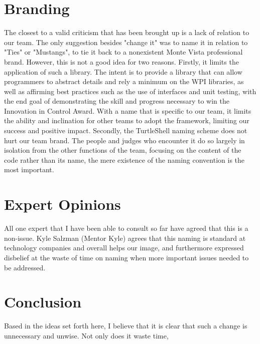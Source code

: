 \documentclass[]{article}
\begin{document}
\section{Branding}
The closest to a valid criticism that has been brought up is a lack of relation to our team. The only suggestion besides "change it" was to name it in relation to "Ties" or "Mustangs", to tie it back to a nonexistent Monte Vista professional brand. However, this is not a good idea for two reasons. Firstly, it limits the application of such a library. The intent is to provide a library that can allow programmers to abstract details and rely a minimum on the WPI libraries, as well as affirming best practices such as the use of interfaces and unit testing, with the end goal of demonstrating the skill and progress necessary to win the Innovation in Control Award. With a name that is specific to our team, it limits the ability and inclination for other teams to adopt the framework, limiting our success and positive impact. Secondly, the TurtleShell naming scheme does not hurt our team brand. The people and judges who encounter it do so largely in isolation from the other functions of the team, focusing on the content of the code rather than its name, the mere existence of the naming convention is the most important.

\section{Expert Opinions}
All one expert that I have been able to consult so far have agreed that this is a non-issue. Kyle Salzman (Mentor Kyle) agrees that this naming is standard at technology companies and overall helps our image, and furthermore expressed disbelief at the waste of time on naming when more important issues needed to be addressed. 

\section{Conclusion}
Based in the ideas set forth here, I believe that it is clear that such a change is unnecessary and unwise. Not only does it waste time, 
\end{document}

